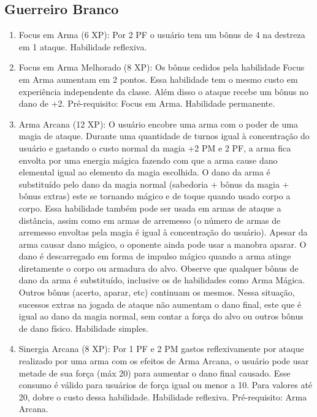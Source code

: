  \subsection{Guerreiro Branco}
  
 
\begin{enumerate}

	\item Focus em Arma (6 XP): Por 2 PF o usuário tem um bônus de 4 na destreza em 1 ataque. Habilidade reflexiva.

	\item Focus em Arma Melhorado (8 XP): Os bônus cedidos pela habilidade Focus em Arma aumentam em 2 pontos. Essa habilidade tem o mesmo custo em experiência independente da classe. Além disso o ataque recebe um bônus no dano de +2. Pré-requisito: Focus em Arma. Habilidade permanente.

     
  \item Arma Arcana (12 XP): O usuário encobre uma arma com o poder de uma magia de ataque. Durante uma quantidade de turnos igual à concentração do usuário e gastando o custo normal da magia +2 PM e 2 PF, a arma fica envolta por uma energia mágica fazendo com que a arma cause dano elemental igual ao elemento da magia escolhida. O dano da arma é substituído pelo dano da magia normal (sabedoria + bônus da magia + bônus extras) este se tornando mágico e de toque quando usado corpo a corpo. Essa habilidade também pode ser usada em armas de ataque a distância, assim como em armas de arremesso (o número de armas de arremesso envoltas pela magia é igual à concentração do usuário). Apesar da arma causar dano mágico, o oponente ainda pode usar a manobra aparar. O dano é descarregado em forma de impulso mágico quando a arma atinge diretamente o corpo ou armadura do alvo. Observe que qualquer bônus de dano da arma é substituído, inclusive os de habilidades como Arma Mágica. Outros bônus (acerto, aparar, etc) continuam os mesmos. Nessa situação, sucessos extras na jogada de ataque não aumentam o dano final, este que é igual ao dano da magia normal, sem contar a força do alvo ou outros bônus de dano físico. Habilidade simples. 
  
  \item Sinergia Arcana (8 XP): Por 1 PF e 2 PM gastos reflexivamente por ataque realizado por uma arma com os efeitos de Arma Arcana, o usuário pode usar metade de sua força (máx 20) para aumentar o dano final causado. Esse consumo é válido para usuários de força igual ou menor a 10. Para valores até 20, dobre o custo dessa habilidade. Habilidade reflexiva. Pré-requisito: Arma Arcana. 
  

\end{enumerate}
